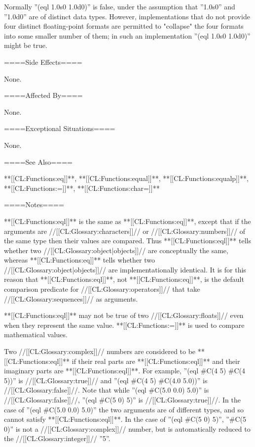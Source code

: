 Normally ''(eql 1.0s0 1.0d0)'' is false, under the assumption that ''1.0s0'' and ''1.0d0'' are of distinct data types. However, implementations that do not provide four distinct floating-point formats are permitted to "collapse" the four formats into some smaller number of them; in such an implementation ''(eql 1.0s0 1.0d0)'' might be true.

====Side Effects====

None.

====Affected By====

None.

====Exceptional Situations====

None.

====See Also====

**[[CL:Functions:eq]]**, **[[CL:Functions:equal]]**, **[[CL:Functions:equalp]]**, **[[CL:Functions:=]]**, **[[CL:Functions:char=]]**

====Notes====

**[[CL:Functions:eql]]** is the same as **[[CL:Functions:eq]]**, except that if the arguments are //[[CL:Glossary:characters]]// or //[[CL:Glossary:numbers]]// of the same type then their values are compared. Thus **[[CL:Functions:eql]]** tells whether two //[[CL:Glossary:object|objects]]// are conceptually the same, whereas **[[CL:Functions:eq]]** tells whether two //[[CL:Glossary:object|objects]]// are implementationally identical. It is for this reason that **[[CL:Functions:eql]]**, not **[[CL:Functions:eq]]**, is the default comparison predicate for //[[CL:Glossary:operators]]// that take //[[CL:Glossary:sequences]]// as arguments.

**[[CL:Functions:eql]]** may not be true of two //[[CL:Glossary:floats]]// even when they represent the same value. **[[CL:Functions:=]]** is used to compare mathematical values.

Two //[[CL:Glossary:complex]]// numbers are considered to be **[[CL:Functions:eql]]** if their real parts are **[[CL:Functions:eql]]** and their imaginary parts are **[[CL:Functions:eql]]**. For example, ''(eql #C(4 5) #C(4 5))'' is //[[CL:Glossary:true]]// and ''(eql #C(4 5) #C(4.0 5.0))'' is //[[CL:Glossary:false]]//. Note that while ''(eql #C(5.0 0.0) 5.0)'' is //[[CL:Glossary:false]]//, ''(eql #C(5 0) 5)'' is //[[CL:Glossary:true]]//. In the case of ''(eql #C(5.0 0.0) 5.0)'' the two arguments are of different types, and so cannot satisfy **[[CL:Functions:eql]]**. In the case of ''(eql #C(5 0) 5)'', ''#C(5 0)'' is not a //[[CL:Glossary:complex]]// number, but is automatically reduced to the //[[CL:Glossary:integer]]// ''5''.

